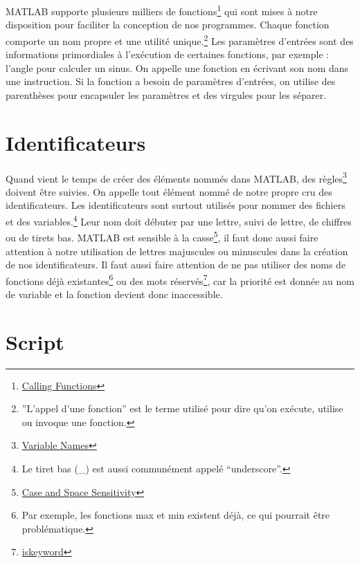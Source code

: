 \documentclass[]{tufte-handout}
\begin{document}
MATLAB supporte plusieurs milliers de fonctions\footnote{\href{https://www.mathworks.com/help/matlab/learn_matlab/calling-functions.html}{Calling
  Functions}} qui sont mises à notre disposition pour faciliter la
conception de nos programmes. Chaque fonction comporte un nom propre et
une utilité unique.\footnote{''L'appel d'une fonction'' est le terme
  utilisé pour dire qu'on exécute, utilise ou invoque une fonction.} Les
paramètres d'entrées sont des informations primordiales à l'exécution de
certaines fonctions, par exemple : l'angle pour calculer un sinus. On
appelle une fonction en écrivant son nom dans une instruction. Si la
fonction a besoin de paramètres d'entrées, on utilise des parenthèses
pour encapsuler les paramètres et des virgules pour les séparer.

\hypertarget{identificateurs}{%
\section{Identificateurs}\label{identificateurs}}

Quand vient le temps de créer des éléments nommés dans MATLAB, des
règles\footnote{\href{https://www.mathworks.com/help/matlab/matlab_prog/variable-names.html}{Variable
  Names}} doivent être suivies. On appelle tout élément nommé de notre
propre cru des identificateurs. Les identificateurs sont surtout
utilisés pour nommer des fichiers et des variables.\footnote{Le tiret
  bas (\_) est aussi communément appelé ``underscore''.} Leur nom doit
débuter par une lettre, suivi de lettre, de chiffres ou de tirets bas.
MATLAB est sensible à la casse\footnote{\href{https://www.mathworks.com/help/matlab/matlab_prog/case-and-space-sensitivity.html}{Case
  and Space Sensitivity}}, il faut donc aussi faire attention à notre
utilisation de lettres majuscules ou minuscules dans la création de nos
identificateurs. Il faut aussi faire attention de ne pas utiliser des
noms de fonctions déjà existantes\footnote{Par exemple, les fonctions
  max et min existent déjà, ce qui pourrait être problématique.} ou des
mots réservés\footnote{\href{https://www.mathworks.com/help/matlab/ref/iskeyword.html}{iskeyword}},
car la priorité est donnée au nom de variable et la fonction devient
donc inaccessible.

\hypertarget{script}{%
\section{Script}\label{script}}
\end{document}
